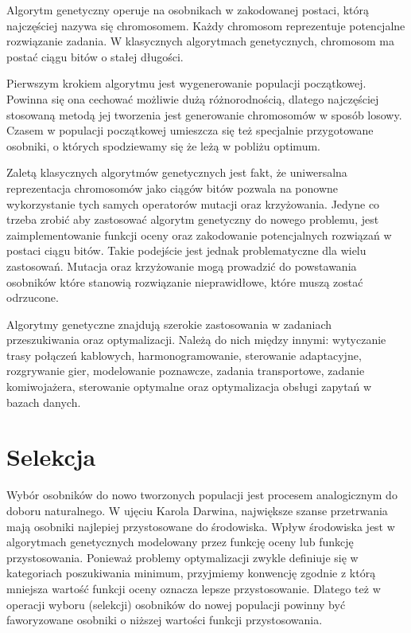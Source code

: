 \documentclass{xmgr}
\begin{document}
Algorytm genetyczny operuje na osobnikach w zakodowanej postaci, którą najczęściej nazywa się chromosomem. Każdy chromosom reprezentuje potencjalne rozwiązanie zadania. W klasycznych algorytmach genetycznych, chromosom ma postać ciągu bitów o stałej długości.

Pierwszym krokiem algorytmu jest wygenerowanie populacji początkowej. Powinna się ona cechować możliwie dużą różnorodnością, dlatego najczęściej stosowaną metodą jej tworzenia jest generowanie chromosomów w sposób losowy. Czasem w populacji początkowej umieszcza się też specjalnie przygotowane osobniki, o których spodziewamy się że leżą w pobliżu optimum.

Zaletą klasycznych algorytmów genetycznych jest fakt, że uniwersalna reprezentacja chromosomów jako ciągów bitów pozwala na ponowne wykorzystanie tych samych operatorów mutacji oraz krzyżowania. Jedyne co trzeba zrobić aby zastosować algorytm genetyczny do nowego problemu, jest zaimplementowanie funkcji oceny oraz zakodowanie potencjalnych rozwiązań w postaci ciągu bitów. Takie podejście jest jednak problematyczne dla wielu zastosowań. Mutacja oraz krzyżowanie mogą prowadzić do powstawania osobników które stanowią rozwiązanie nieprawidłowe, które muszą zostać odrzucone.

Algorytmy genetyczne znajdują szerokie zastosowania w zadaniach przeszukiwania oraz optymalizacji. Należą do nich między innymi: wytyczanie trasy połączeń kablowych, harmonogramowanie, sterowanie adaptacyjne, rozgrywanie gier, modelowanie poznawcze, zadania transportowe, zadanie komiwojażera, sterowanie optymalne oraz optymalizacja obsługi zapytań w bazach danych.\cite{Michalewicz:2003:AGSDPE}

\section{Selekcja}

Wybór osobników do nowo tworzonych populacji jest procesem analogicznym do doboru naturalnego. W ujęciu Karola Darwina, największe szanse przetrwania mają osobniki najlepiej przystosowane do środowiska. Wpływ środowiska jest w algorytmach genetycznych modelowany przez funkcję oceny lub funkcję przystosowania. Ponieważ problemy optymalizacji zwykle definiuje się w kategoriach poszukiwania minimum, przyjmiemy konwencję zgodnie z którą mniejsza wartość funkcji oceny oznacza lepsze przystosowanie. Dlatego też w operacji wyboru (selekcji) osobników do nowej populacji powinny być faworyzowane osobniki o niższej wartości funkcji przystosowania.
\end{document}
